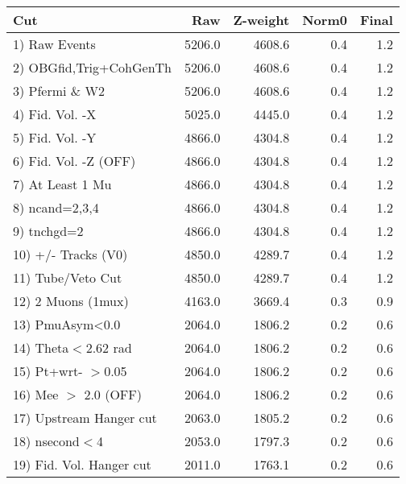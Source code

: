  \begin{table}[h!]\centering
 \begin{tabular}{||l||r|r|r|r||}
 \hline
 \hline
 Cut & Raw & Z-weight & Norm0 & Final \\
 \hline
  1) Raw Events           &      5206.0 &      4608.6 &         0.4 &         1.2 \\
  2) OBGfid,Trig+CohGenTh &      5206.0 &      4608.6 &         0.4 &         1.2 \\
  3) Pfermi \& W2         &      5206.0 &      4608.6 &         0.4 &         1.2 \\
  4) Fid. Vol. -X         &      5025.0 &      4445.0 &         0.4 &         1.2 \\
  5) Fid. Vol. -Y         &      4866.0 &      4304.8 &         0.4 &         1.2 \\
  6) Fid. Vol. -Z (OFF)   &      4866.0 &      4304.8 &         0.4 &         1.2 \\
  7) At Least 1 Mu        &      4866.0 &      4304.8 &         0.4 &         1.2 \\
  8) ncand=2,3,4          &      4866.0 &      4304.8 &         0.4 &         1.2 \\
  9) tnchgd=2             &      4866.0 &      4304.8 &         0.4 &         1.2 \\
 10) +/- Tracks (V0)      &      4850.0 &      4289.7 &         0.4 &         1.2 \\
 11) Tube/Veto Cut        &      4850.0 &      4289.7 &         0.4 &         1.2 \\
 12) 2 Muons (1mux)       &      4163.0 &      3669.4 &         0.3 &         0.9 \\
 13) PmuAsym<0.0          &      2064.0 &      1806.2 &         0.2 &         0.6 \\
 14) Theta$<$2.62 rad     &      2064.0 &      1806.2 &         0.2 &         0.6 \\
 15) Pt+wrt- $>$0.05      &      2064.0 &      1806.2 &         0.2 &         0.6 \\
 16) Mee $>$ 2.0  (OFF)   &      2064.0 &      1806.2 &         0.2 &         0.6 \\
 17) Upstream Hanger cut  &      2063.0 &      1805.2 &         0.2 &         0.6 \\
 18) nsecond$<$4          &      2053.0 &      1797.3 &         0.2 &         0.6 \\
 19) Fid. Vol. Hanger cut &      2011.0 &      1763.1 &         0.2 &         0.6 \\

\end{tabular}
\end{table}
